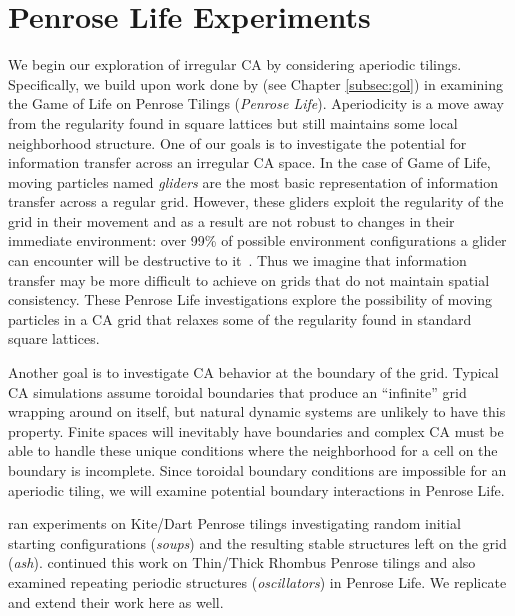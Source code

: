 \documentclass[a4paper,11pt,twoside]{report}
\begin{document}
\processdelayedfloats

\chapter{Penrose Life Experiments}
\label{ch:penrose}

We begin our exploration of irregular CA by considering aperiodic tilings. Specifically, we build upon work done by \citeauthor{hi05} (see Chapter \ref{subsec:gol}) in examining the Game of Life on Penrose Tilings (\textit{Penrose Life}). Aperiodicity is a move away from the regularity found in square lattices but still maintains some local neighborhood structure. 
One of our goals is to investigate the potential for information transfer across an irregular CA space. In the case of Game of Life, moving particles named \textit{gliders} are the most basic representation of information transfer across a regular grid. However, these gliders exploit the regularity of the grid in their movement and as a result are not robust to changes in their immediate environment: over 99\% of possible environment configurations a glider can encounter will be destructive to it~\cite{be14}. Thus we imagine that information transfer may be more difficult to achieve on grids that do not maintain spatial consistency. These Penrose Life investigations explore the possibility of moving particles in a CA grid that relaxes some of the regularity found in standard square lattices.     

Another goal is to investigate CA behavior at the boundary of the grid. Typical CA simulations assume toroidal boundaries that produce an ``infinite'' grid wrapping around on itself, but natural dynamic systems are unlikely to have this property. Finite spaces will inevitably have boundaries and complex CA must be able to handle these unique conditions where the neighborhood for a cell on the boundary is incomplete. Since toroidal boundary conditions are impossible for an aperiodic tiling, we will examine potential boundary interactions in Penrose Life.


\citeauthor{hi05} ran experiments on Kite/Dart Penrose tilings investigating random initial starting configurations (\textit{soups}) and the resulting stable structures left on the grid (\textit{ash}). \citeauthor{ow10} continued this work on Thin/Thick Rhombus Penrose tilings and also examined repeating periodic structures (\textit{oscillators}) in Penrose Life. We replicate and extend their work here as well.
\end{document}
